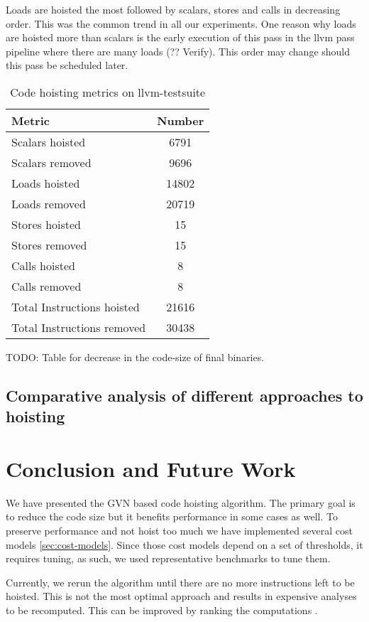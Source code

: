 \documentclass{sig-alternate}
\begin{document}
Loads are hoisted the most followed by scalars, stores and calls in decreasing
order.  This was the common trend in all our experiments. One reason why loads
are hoisted more than scalars is the early execution of this pass in the llvm
pass pipeline where there are many loads (?? Verify). This order may change should this pass
be scheduled later.

\begin{table}[h!]
  \begin{center}
    \begin{tabular}{|l|c|}
      \hline
      Metric                   	     & Number\\\hline
      Scalars hoisted      & 6791  \\\hline
      Scalars removed      & 9696  \\\hline
      Loads hoisted        & 14802 \\\hline
      Loads removed        & 20719 \\\hline
      Stores hoisted       & 15    \\\hline
      Stores removed       & 15    \\\hline
      Calls hoisted        & 8     \\\hline
      Calls removed        & 8     \\\hline
      Total Instructions hoisted & 21616 \\\hline
      Total Instructions removed & 30438 \\\hline
\end{tabular}
  \end{center}
  \caption{Code hoisting metrics on llvm-testsuite}
  \label{tab:results}
\end{table}


TODO: Table for decrease in the code-size of final binaries.

\subsection{Comparative analysis of different approaches to hoisting}


\section{Conclusion and Future Work}
\label{sec:future-work}
We have presented the GVN based code hoisting algorithm. The primary goal is to
reduce the code size but it benefits performance in some cases as well. To
preserve performance and not hoist too much we have implemented several cost
models \ref{sec:cost-models}. Since those cost models depend on a set of thresholds,
it requires tuning, as such, we used representative benchmarks to tune them.

Currently, we rerun the algorithm until there are no more instructions left to
be hoisted. This is not the most optimal approach and results in expensive
analyses to be recomputed. This can be improved by ranking the computations
\cite{rosen1988global}.


{\small

}
\end{document}
